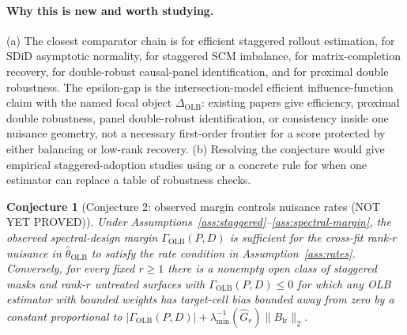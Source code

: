 \documentclass[11pt]{article}
\theoremstyle{definition}
\theoremstyle{plain}
\newtheorem{conjecture}{Conjecture}
\theoremstyle{remark}
\begin{document}
\paragraph{Why this is new and worth studying.}
(a) The closest comparator chain is \citet[Sections 3--4]{RothSantAnna2021} for efficient staggered rollout estimation, \citet[Sections 2--3]{ArkhangelskyAtheyHirshbergImbensWager2021} for SDiD asymptotic normality, \citet[Section 2.2 and Theorem 1]{BenMichaelFellerRothstein2022} for staggered SCM imbalance, \citet[Sections 2--3]{AtheyBayatiDoudchenkoImbensKhosravi2021} for matrix-completion recovery, \citet[Sections 2--3]{ArkhangelskyImbens2022} for double-robust causal-panel identification, and \citet[Sections 2--3]{QiuShiMiaoWangDobribanTchetgen2024} for proximal double robustness.  The epsilon-gap is the intersection-model efficient influence-function claim with the named focal object \(\Delta_{\mathrm{OLB}}\): existing papers give efficiency, proximal double robustness, panel double-robust identification, or consistency inside one nuisance geometry, not a necessary first-order frontier for a score protected by either balancing or low-rank recovery.  (b) Resolving the conjecture would give empirical staggered-adoption studies using \citet{ArkhangelskyAtheyHirshbergImbensWager2021} or \citet{AtheyBayatiDoudchenkoImbensKhosravi2021} a concrete rule for when one estimator can replace a table of robustness checks.

\begin{conjecture}[Conjecture 2: observed margin controls nuisance rates (NOT YET PROVED)]\label{conj:margin-rate}
Under Assumptions~\ref{ass:staggered}--\ref{ass:spectral-margin}, the observed spectral-design margin \(\Gamma_{\mathrm{OLB}}(P,D)\) is sufficient for the cross-fit rank-\(r\) nuisance in \(\widehat\theta_{\mathrm{OLB}}\) to satisfy the rate condition in Assumption~\ref{ass:rates}.  Conversely, for every fixed \(r\ge1\) there is a nonempty open class of staggered masks and rank-\(r\) untreated surfaces with \(\Gamma_{\mathrm{OLB}}(P,D)\le0\) for which any OLB estimator with bounded weights has target-cell bias bounded away from zero by a constant proportional to \(|\Gamma_{\mathrm{OLB}}(P,D)|+\lambda_{\min}^{-1}(\widehat G_r)\|B_{\mathrm{lr}}\|_2\).
\end{conjecture}
\end{document}
